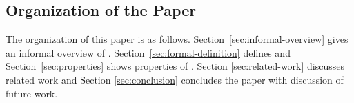 \subsection{Organization of the Paper}

The organization of this paper is as follows.
Section~\ref{sec:informal-overview} gives an informal overview of
\LMD.  Section~\ref{sec:formal-definition} defines \LMD and
Section~\ref{sec:properties} shows properties of \LMD.  Section
\ref{sec:related-work} discusses related work and Section
\ref{sec:conclusion} concludes the paper with discussion of future
work.
